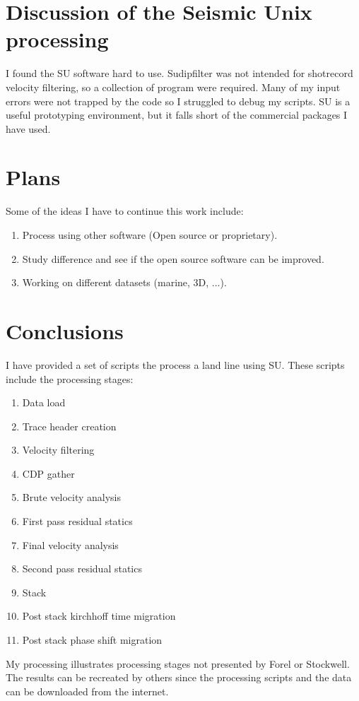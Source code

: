 \section{Discussion of the Seismic Unix processing}
I found the SU software hard to use.  Sudipfilter was not intended for 
shotrecord velocity filtering, so a collection of program were required.  
Many of my input errors were not trapped by the code so I struggled to 
debug my scripts.  SU is a useful prototyping environment, but it falls 
short of the commercial packages I have used.

\section{Plans}
Some of the ideas I have to continue this work include:

\begin{enumerate}
\item Process using other software (Open source or proprietary). 
\item Study difference and see if the open source software can be improved.
\item Working on different datasets (marine, 3D, ...).
\end{enumerate}

\section{Conclusions}
I have provided a set of scripts the process a land line using SU.  These scripts include the processing stages:

\begin{enumerate}
\item Data load
\item Trace header creation
\item Velocity filtering 
\item CDP gather
\item Brute velocity analysis
\item First pass residual statics
\item Final velocity analysis
\item Second pass residual statics
\item Stack
\item Post stack kirchhoff time migration
\item Post stack phase shift migration
\end{enumerate}

My processing illustrates processing stages not presented by Forel
or Stockwell. The results can be recreated by others since the processing
scripts and the data can be downloaded from the internet.

